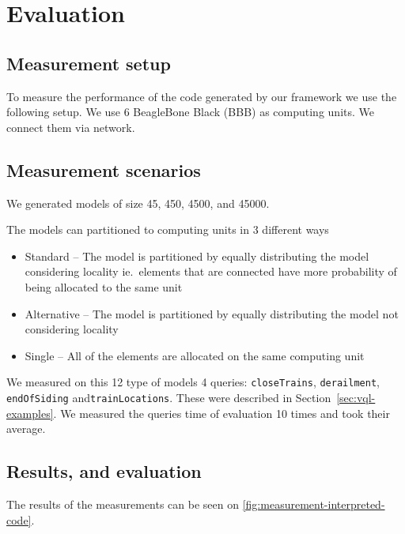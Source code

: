 
\chapter{Evaluation}


\section{Measurement setup}

To measure the performance of the code generated by our framework we use the following setup.
We use 6 BeagleBone Black (BBB) \cite{BBB} as computing units. 
We connect them via network. 


\section{Measurement scenarios}

We generated models of size 45, 450, 4500, and 45000.

The models can partitioned to computing units in 3 different ways 
\begin{itemize}
	\item Standard -- The model is partitioned by equally distributing the model considering locality ie.\ elements that are connected have more probability of being allocated to the same unit
	\item Alternative -- The model is partitioned by equally distributing the model not considering locality
	\item Single -- All of the elements are allocated on the same computing unit
\end{itemize}

We measured on this 12 type of models 4 queries: \texttt{closeTrains}, \texttt{derailment}, \texttt{endOfSiding} and\texttt{trainLocations}. 
These were described in Section~\ref{sec:vql-examples}.
We measured the queries time of evaluation 10 times and took their average.

\pagebreak

\section{Results, and evaluation}

The results of the measurements can be seen on \autoref{fig:measurement-interpreted-code}.

